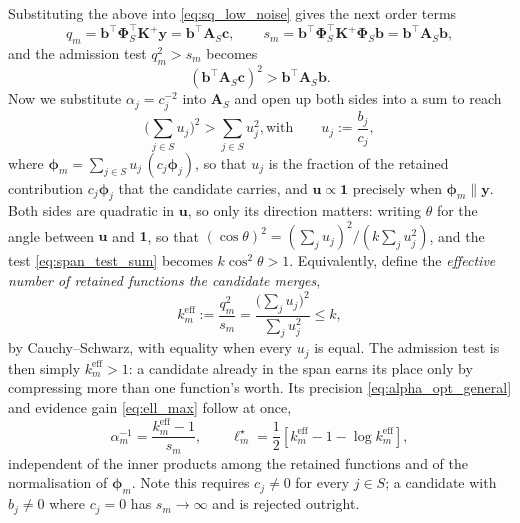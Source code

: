 \documentclass[a4paper]{article}
\renewcommand{\vec}[1]{\boldsymbol{#1}}
\begin{document}
Substituting the above into \eqref{eq:sq_low_noise} gives the next order terms
\begin{equation} 
    q_m = \vec b^\top \mathbf \Phi_S^\top \mathbf K^+ \mathbf y = \vec b^\top \mathbf A_S \mathbf c,
    \qquad
    s_m = \vec b^\top \mathbf \Phi_S^\top \mathbf K^+ \mathbf \Phi_S \vec b = \vec b^\top \mathbf A_S \vec b,
\end{equation}
and the admission test $q_m^2 > s_m$ becomes
\begin{equation} \label{eq:sq_in_span}
    (\vec b^\top \mathbf A_S \mathbf c)^2 > \vec b^\top \mathbf A_S \vec b.
\end{equation}
Now we substitute $\alpha_j = c_j^{-2}$ into $\mathbf A_S$ and open up both sides into a sum to reach
\begin{equation} \label{eq:span_test_sum}
    \Big( \sum_{j \in S} u_j \Big)^{\!2} > \sum_{j \in S} u_j^2,
    \text{with} \qquad  u_j := \frac{b_j}{c_j},
\end{equation}
where $\vec \phi_m = \sum_{j \in S} u_j \, ( c_j \vec \phi_j )$, so that $u_j$ is the fraction of the retained contribution $c_j \vec \phi_j$ that the candidate carries, and $\vec u \propto \mathbf 1$ precisely when $\vec \phi_m \parallel \mathbf y$. Both sides are quadratic in $\vec u$, so only its direction matters: writing $\theta$ for the angle between $\vec u$ and $\mathbf 1$, so that $(\cos \theta)^2 = (\sum_j u_j)^2 / (k \sum_j u_j^2)$, and the test \eqref{eq:span_test_sum} becomes $k \cos^2 \theta > 1$. Equivalently, define the \emph{effective number of retained functions the candidate merges},
\begin{equation} \label{eq:keff}
    k_m^{\mathrm{eff}} := \frac{q_m^2}{s_m}
    = \frac{\big( \sum_{j} u_j \big)^2}{\sum_j u_j^2} \leq k,
\end{equation}
by Cauchy--Schwarz, with equality when every $u_j$ is equal. The admission test is then simply
$k_m^{\mathrm{eff}} > 1$: a candidate already in the span earns its place only by compressing more
than one function's worth. Its precision \eqref{eq:alpha_opt_general} and evidence gain
\eqref{eq:ell_max} follow at once,
\begin{equation} \label{eq:span_gain}
    \alpha_m^{-1} = \frac{k_m^{\mathrm{eff}} - 1}{s_m},
    \qquad
    \ell_m^\star = \frac{1}{2} \left[ k_m^{\mathrm{eff}} - 1 - \log k_m^{\mathrm{eff}} \right],
\end{equation}
independent of the inner products among the retained functions and of the normalisation of
$\vec \phi_m$. Note this requires $c_j \neq 0$ for every $j \in S$; a candidate with $b_j \neq 0$
where $c_j = 0$ has $s_m \to \infty$ and is rejected outright.
\end{document}
